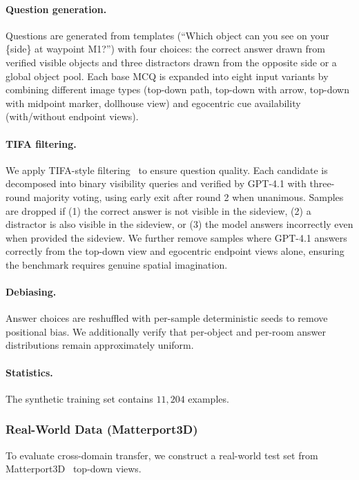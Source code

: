 \paragraph{Question generation.}
Questions are generated from templates (``Which object can you see on your \{side\} at waypoint M1?'') with four choices: the correct answer drawn from verified visible objects and three distractors drawn from the opposite side or a global object pool.
Each base MCQ is expanded into eight input variants by combining different image types (top-down path, top-down with arrow, top-down with midpoint marker, dollhouse view) and egocentric cue availability (with/without endpoint views).

\paragraph{TIFA filtering.}
We apply TIFA-style filtering~\cite{hu2023tifa} to ensure question quality.
Each candidate is decomposed into binary visibility queries and verified by GPT-4.1 with three-round majority voting, using early exit after round 2 when unanimous.
Samples are dropped if (1) the correct answer is not visible in the sideview, (2) a distractor is also visible in the sideview, or (3) the model answers incorrectly even when provided the sideview.
We further remove samples where GPT-4.1 answers correctly from the top-down view and egocentric endpoint views alone, ensuring the benchmark requires genuine spatial imagination.

\paragraph{Debiasing.}
Answer choices are reshuffled with per-sample deterministic seeds to remove positional bias.
We additionally verify that per-object and per-room answer distributions remain approximately uniform.

\paragraph{Statistics.}
The synthetic training set contains $11{,}204$ examples.

\subsubsection{Real-World Data (Matterport3D)}

To evaluate cross-domain transfer, we construct a real-world test set from Matterport3D~\cite{chang2017matterport3d} top-down views.

